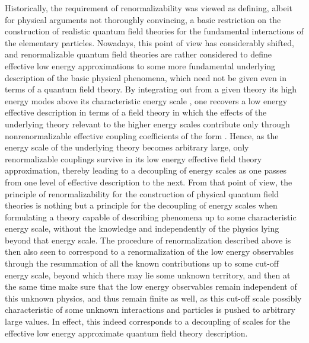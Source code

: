 \documentclass[a4paper,11pt]{article}
\begin{document}
Historically, the requirement of renormalizability was viewed as de\-fi\-ning,
albeit for physical arguments not thoroughly convincing, a basic restriction 
on the construction of realistic quantum field theories for the fundamental
interactions of the elementary particles. Nowadays, this point of view
has considerably shifted, and renormalizable quantum field theories are
rather considered to define effective low energy approximations to some
more fundamental underlying description of the basic physical phenomena,
which need not be given even in terms of a quantum field theory.\cite{Wein1} 
By integrating
out from a given theory its high energy modes above its characteristic energy
scale \myHighlight{$\Lambda$}\coordHE{}, one recovers a low energy effective description in terms of 
a field theory in which the effects of the underlying theory relevant to the 
higher energy scales contribute only through nonrenormalizable effective 
coupling coefficients of the form \coordHE{}. 
Hence, as the energy scale of the underlying theory becomes arbitrary
large, only renormalizable couplings survive in its low energy effective
field theory approximation, thereby leading to a decoupling of energy scales
as one passes from one level of effective description to the next.
From that point of view, the principle of renormalizability for the
construction of physical quantum field theories is nothing but a principle
for the decoupling of energy scales when formulating a theory capable of
describing phenomena up to some characteristic energy scale, without the
knowledge and independently of the physics lying beyond that energy scale.
The procedure of renormalization described above is then also seen to 
correspond to a renormalization of the low energy observables through the
resummation of all the known contributions up to some cut-off energy scale, 
beyond which there may lie some unknown territory, and then at the same time
make sure that the low energy observables remain independent of this unknown 
physics, and thus remain finite as well, as this cut-off scale possibly 
characteristic of some unknown interactions and particles is pushed to 
arbitrary large values. In effect, this indeed corresponds to a decoupling 
of scales for the effective low energy approximate quantum field theory 
description.
\end{document}
